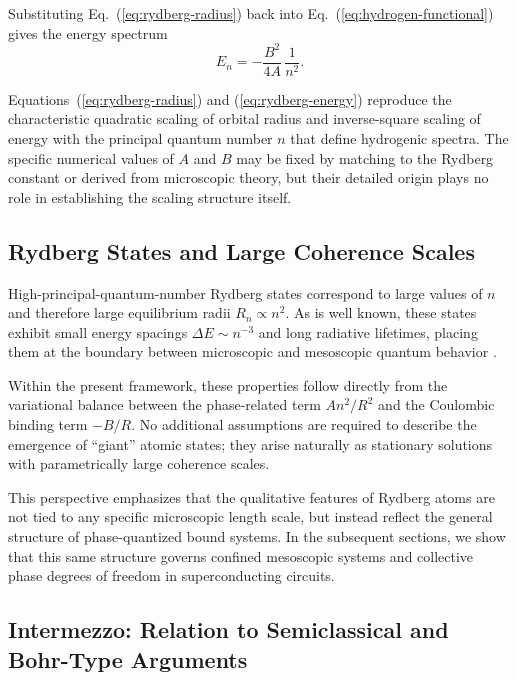 \documentclass[11pt]{article}
\begin{document}
            Substituting Eq.~(\ref{eq:rydberg-radius}) back into Eq.~(\ref{eq:hydrogen-functional}) gives the energy spectrum
            \begin{equation}
                E_n = -\frac{B^2}{4A}\,\frac{1}{n^2}.
                \label{eq:rydberg-energy}
            \end{equation}

            Equations~(\ref{eq:rydberg-radius}) and (\ref{eq:rydberg-energy}) reproduce the characteristic quadratic scaling of orbital radius and inverse-square scaling of energy with the principal quantum number $n$ that define hydrogenic spectra. The specific numerical values of $A$ and $B$ may be fixed by matching to the Rydberg constant or derived from microscopic theory, but their detailed origin plays no role in establishing the scaling structure itself.

        \subsection{Rydberg States and Large Coherence Scales}

            High-principal-quantum-number Rydberg states correspond to large values of $n$ and therefore large equilibrium radii $R_n\propto n^2$. As is well known, these states exhibit small energy spacings $\Delta E\sim n^{-3}$ and long radiative lifetimes, placing them at the boundary between microscopic and mesoscopic quantum behavior \cite{Gallagher1994}.

            Within the present framework, these properties follow directly from the variational balance between the phase-related term $A n^2/R^2$ and the Coulombic binding term $-B/R$. No additional assumptions are required to describe the emergence of ``giant'' atomic states; they arise naturally as stationary solutions with parametrically large coherence scales.

            This perspective emphasizes that the qualitative features of Rydberg atoms are not tied to any specific microscopic length scale, but instead reflect the general structure of phase-quantized bound systems. In the subsequent sections, we show that this same structure governs confined mesoscopic systems and collective phase degrees of freedom in superconducting circuits.

        \subsection*{Intermezzo: Relation to Semiclassical and Bohr-Type Arguments}
\end{document}
